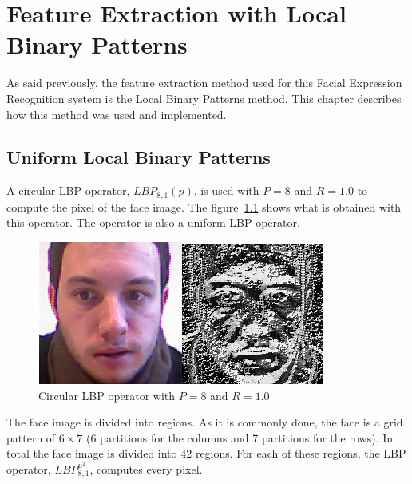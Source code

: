 \chapter{Feature Extraction with Local Binary Patterns}
\label{chap:implementation_lbp}

\noindent As said previously, the feature extraction method used for this Facial Expression Recognition system is the Local Binary Patterns method. This chapter describes how this method was used and implemented.
\newline

\section{Uniform Local Binary Patterns}

\vspace{\baselineskip}
\noindent A circular LBP operator, $ LBP_{8,1}(p) $, is used with $ P = 8 $ and $ R = 1.0 $ to compute the pixel of the face image. The figure~\ref{lbp_implementation_example} shows what is obtained with this operator. The operator is also a uniform LBP operator.
\newline

\begin{figure}[!h]
\begin{center}
\noindent \includegraphics[scale=0.8]{figures/lbp_implementation_example} 
\newline
\caption{Circular LBP operator with $ P = 8 $ and $ R = 1.0 $}
\label{lbp_implementation_example}
\end{center} 
\end{figure}

\noindent The face image is divided into regions. As it is commonly done, the face is a grid pattern of $ 6\times7 $ (6 partitions for the columns and 7 partitions for the rows). In total the face image is divided into 42 regions. For each of these regions, the LBP operator, $ LBP_{8,1}^{u^2} $, computes every pixel.
\newline

